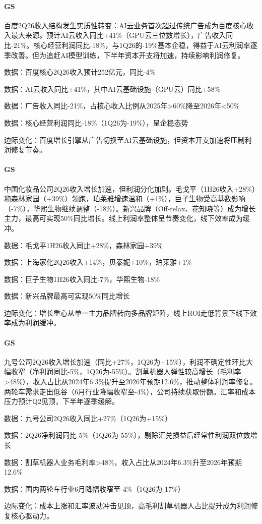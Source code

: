 \documentclass[11pt]{ctexart}
\begin{document}
\paragraph{GS} 百度2Q26收入结构发生实质性转变：AI云业务首次超过传统广告成为百度核心收入最大来源。预计AI云收入同比+41\%（GPU云三位数增长），广告收入同比-21\%。核心经营利润同比-18\%，与1Q26的-19\%基本企稳，得益于AI云利润率逐季改善。但为追赶AI模型训练，下半年资本开支将加速，持续影响利润修复。
{\small\color{refgray}数据：百度核心2Q26收入预计252亿元，同比-4\%\par}
{\small\color{refgray}数据：AI云收入同比+41\%，其中AI云基础设施（GPU云）同比+58\%\par}
{\small\color{refgray}数据：广告收入同比-21\%，占核心收入比例从2025年>60\%降至2026年<50\%\par}
{\small\color{refgray}数据：核心经营利润同比-18\%（1Q26为-19\%），呈企稳态势\par}
{\small\color{refgray}边际变化：百度增长引擎从广告切换至AI云基础设施，但资本开支加速将压制利润修复节奏。\par}
\paragraph{GS} 中国化妆品公司2Q26收入增长加速，但利润分化加剧。毛戈平（1H26收入+28\%）和森林家园（+39\%）领跑，珀莱雅增速温和（+1\%），巨子生物受高基数影响（-7\%），华熙生物继续调整（-18\%）。新兴品牌（Off-relax、花知晓等）成为增长主力，最高可实现50\%同比增长。线上利润率整体呈节奏变化，线下效率成为缓冲。
{\small\color{refgray}数据：毛戈平1H26收入同比+28\%，森林家园+39\%\par}
{\small\color{refgray}数据：上海家化2Q26收入+14\%，贝泰妮+10\%，珀莱雅+1\%\par}
{\small\color{refgray}数据：巨子生物1H26收入同比-7\%，华熙生物-18\%\par}
{\small\color{refgray}数据：新兴品牌最高可实现50\%同比增长\par}
{\small\color{refgray}边际变化：增长重心从单一主力品牌转向多品牌矩阵，线上ROI走低背景下线下效率成为利润缓冲。\par}
\paragraph{GS} 九号公司2Q26收入增长加速（同比+27\%，1Q26为+15\%），利润不确定性环比大幅收窄（净利润同比-5\%，1Q26为-55\%）。割草机器人弹性较高增长（毛利率>48\%），收入占比从2024年6.3\%提升至2026年预期12.6\%，推动整体利润率修复。两轮车需求走出低谷（6月行业降幅收窄至-4\%），公司持续获取份额。汇率和成本压力预计Q2见顶，下半年逐季缓解。
{\small\color{refgray}数据：九号公司2Q26收入同比+27\%（1Q26为+15\%）\par}
{\small\color{refgray}数据：2Q26净利润同比-5\%（1Q26为-55\%），剔除汇兑损益后经常性利润双位数增长\par}
{\small\color{refgray}数据：割草机器人业务毛利率>48\%，收入占比从2024年6.3\%升至2026年预期12.6\%\par}
{\small\color{refgray}数据：国内两轮车行业6月降幅收窄至-4\%（1Q26为-17\%）\par}
{\small\color{refgray}边际变化：成本上涨和汇率波动冲击见顶，高毛利割草机器人占比提升成为利润修复核心驱动力。\par}
\end{document}
